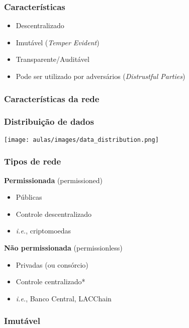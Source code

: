 \documentclass{beamer}
\begin{document}
\begin{frame}
\frametitle{Características}
\begin{itemize}
    \item Descentralizado
    \item Imutável (\textit{Temper Evident})
    \item Transparente/Auditável
    \item Pode ser utilizado por adversários (\textit{Distrustful Parties})
\end{itemize}
\end{frame}

\begin{frame}
  \frametitle{Características da rede}
\end{frame}

\begin{frame}
\frametitle{Distribuição de dados}
 \begin{center}
        \texttt{[image: aulas/images/data\_distribution.png]}
    \end{center}
\end{frame}

\begin{frame}
\frametitle{Tipos de rede}

\textbf{Permissionada} (permissioned)
\begin{itemize}
    \item Públicas
    \item Controle descentralizado
    \item \textit{i.e.}, criptomoedas
\end{itemize}

\vspace{0.5cm} %

\textbf{Não permissionada} (permissionless)
\begin{itemize}
    \item Privadas (ou consórcio)
    \item Controle centralizado*
    \item \textit{i.e.}, Banco Central, LACChain
\end{itemize}
\end{frame}



\begin{frame}
    \frametitle{Imutável}
\end{frame}
\end{document}
